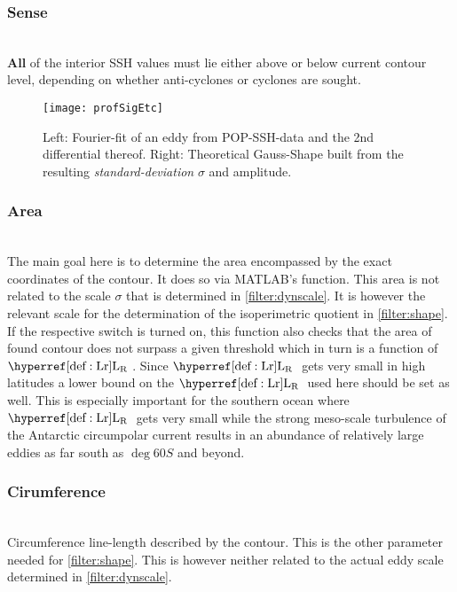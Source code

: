 \subsubsection{Sense}
\\
\textbf{All} of the interior SSH values must lie either above or below current
contour level, depending on whether anti-cyclones or cyclones are sought.
\begin{figure}
	\texttt{[image: profSigEtc]}
	\caption{Left: Fourier-fit of an eddy from POP-SSH-data and the 2nd differential thereof. Right: Theoretical Gauss-Shape built from the resulting \textit{standard-deviation} \ie $\sigma$ and amplitude.}
	\label{fig:profSigEtc}
\end{figure}
\subsubsection{Area} \label{filter:area}
\\
The main goal here is to determine the area encompassed by the exact coordinates of the contour. It does so via MATLAB's  function. This area is not related to the scale $\sigma$ that is determined in \ref{filter:dynscale}. It is however the relevant scale for the determination of the isoperimetric quotient in \ref{filter:shape}.\\
If the respective switch is turned on, this function also checks that the area of found contour does not surpass a given threshold which in turn is a function of $\Lr$. Since $\Lr$ gets very small in high latitudes a lower bound on the $\Lr$ used here should be set as well. This is especially important for the southern ocean where $\Lr$ gets very small while the strong meso-scale turbulence of the Antarctic circumpolar current results in an abundance of relatively large eddies as far south as $\deg{60} S$ and beyond.
\subsubsection{Cirumference}
\\
Circumference \eg line-length described by the contour. This is the other parameter needed for \ref{filter:shape}. This is however neither related to the actual eddy scale determined in
\ref{filter:dynscale}.
